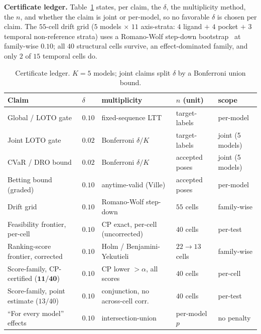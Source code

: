 \documentclass[10pt]{article}
\begin{document}
\textbf{Certificate ledger.} Table~\ref{tab:ledger} states, per claim, the $\delta$, the multiplicity
method, the $n$, and whether the claim is joint or per-model, so no favorable $\delta$ is chosen per claim.
The $55$-cell drift grid ($5$ models $\times$ $11$ axis-strata: $4$ ligand $+$ $4$ pocket $+$ $3$ temporal
non-reference strata) uses a Romano-Wolf step-down bootstrap~\citep{romanowolf2005} at family-wise $0.10$;
all $40$ structural cells survive, an effect-dominated family, and only $2$ of $15$ temporal cells do.

\begin{table}[t]
\centering\small
\caption{Certificate ledger. $K=5$ models; joint claims split $\delta$ by a Bonferroni union bound.}
\label{tab:ledger}
\begin{tabular}{lllll}
\toprule
Claim & $\delta$ & multiplicity & $n$ (unit) & scope \\
\midrule
Global / LOTO gate & $0.10$ & fixed-sequence LTT & target-labels & per-model \\
Joint LOTO gate & $0.02$ & Bonferroni $\delta/K$ & target-labels & joint (5 models) \\
CVaR / DRO bound & $0.02$ & Bonferroni $\delta/K$ & accepted poses & joint (5 models) \\
Betting bound (graded) & $0.10$ & anytime-valid (Ville) & accepted poses & per-model \\
Drift grid & $0.10$ & Romano-Wolf step-down & $55$ cells & family-wise \\
Feasibility frontier, per-cell & $0.10$ & CP exact, per-cell (uncorrected) & $40$ cells & per-test \\
Ranking-score frontier, corrected & $0.10$ & Holm / Benjamini-Yekutieli & $22\!\to\!13$ cells & family-wise \\
Score-family, CP-certified ($\mathbf{11/40}$) & $0.10$ & CP lower $>\alpha$, all scores & $40$ cells & per-cell \\
Score-family, point estimate ($13/40$) & $0.10$ & conjunction, no across-cell corr. & $40$ cells & per-test \\
``For every model'' effects & $0.10$ & intersection-union & per-model $p$ & no penalty \\
\bottomrule
\end{tabular}
\end{table}
\end{document}
